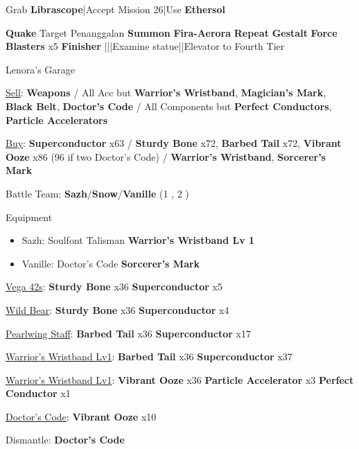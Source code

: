 \begin{mainlist}
	\item Grab \textbf{Librascope}|Accept Mission 26|Use \textbf{Ethersol}
	\item {} \textbf{Quake} \to Target Penanggalan \to \textbf{Summon} \to \textbf{Fira-Aerora} \to [6] \textbf{Repeat} \to \textbf{Gestalt} \to \textbf{Force Blasters} x5 \to \textbf{Finisher} |\skip|\skip|Examine statue|\skip|Elevator to Fourth Tier
\end{mainlist}
\begin{shop}{Lenora's Garage}
	\item \underline{Sell}: \textbf{Weapons} / All Acc but \textbf{Warrior's Wristband}, \textbf{Magician's Mark}, \textbf{Black Belt}, \textbf{Doctor's Code} / All Components but \textbf{Perfect Conductors}, \textbf{Particle Accelerators}
	\item \underline{Buy}: \textbf{Superconductor} x63 / \textbf{Sturdy Bone} x72, \textbf{Barbed Tail} x72, \textbf{Vibrant Ooze} x86 (96 if two Doctor's Code) / \textbf{Warrior's Wristband}, \textbf{Sorcerer's Mark}
\end{shop}
\begin{menu}
	\item Battle Team: \textbf{Sazh}/\textbf{Snow}/\textbf{Vanille} (1 , 2 )
	\item Equipment
	\begin{itemize}
		\item Sazh: Soulfont Talisman \to \textbf{Warrior's Wristband Lv 1}
		\item Vanille: Doctor's Code \to \textbf{Sorcerer's Mark}
	\end{itemize}
\end{menu}
\begin{upgrade}
	\item \underline{Vega 42s}: \textbf{Sturdy Bone} x36 \to \textbf{Superconductor} x5
	\item \underline{Wild Bear}: \textbf{Sturdy Bone} x36 \to \textbf{Superconductor} x4
	\item \underline{Pearlwing Staff}: \textbf{Barbed Tail} x36 \to \textbf{Superconductor} x17
	\item \underline{Warrior's Wristband Lv1}: \textbf{Barbed Tail} x36 \to \textbf{Superconductor} x37
	\item \underline{Warrior's Wristband Lv1}: \textbf{Vibrant Ooze} x36 \to \textbf{Particle Accelerator} x3 \to \textbf{Perfect Conductor} x1
	\item \underline{Doctor's Code}: \textbf{Vibrant Ooze} x10
	\item Dismantle: \textbf{Doctor's Code}
\end{upgrade}
